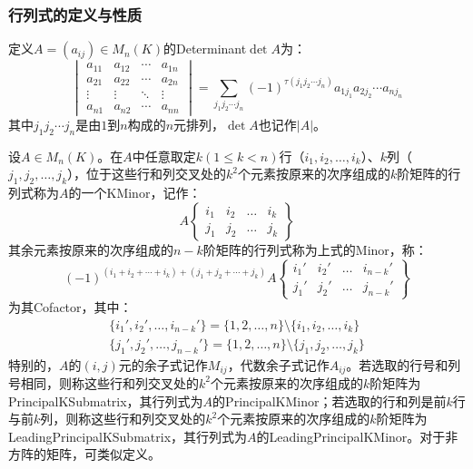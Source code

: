 \subsubsection{行列式的定义与性质}
\begin{definition}
	定义$A=(a_{ij})\in M_{n}(K)$的\gls{Determinant}$\det A$为：
	\begin{equation*}
		\begin{vmatrix}
			a_{11} & a_{12} & \cdots & a_{1n} \\
			a_{21} & a_{22} & \cdots & a_{2n} \\
			\vdots & \vdots & \ddots & \vdots \\
			a_{n1} & a_{n2} & \cdots & a_{nn}
		\end{vmatrix}=
		\sum_{j_1j_2\cdots j_n}(-1)^{\tau(j_1j_2\cdots j_n)}a_{1j_1}a_{2j_2}\cdots a_{nj_n}
	\end{equation*}
	其中$j_1j_2\cdots j_n$是由$1$到$n$构成的$n$元排列，$\det A$也记作$|A|$。
\end{definition} 
\begin{definition}
	设$A\in M_{n}(K)$。在$A$中任意取定$k(1\leqslant k<n)$行（$i_1,i_2,\dots,i_k$）、$k$列（$j_1,j_2,\dots,j_k$），位于这些行和列交叉处的$k^2$个元素按原来的次序组成的$k$阶矩阵的行列式称为$A$的一个\gls{KMinor}，记作：
	\begin{equation*}
		A\left\{
		\begin{array}{*{4}{c}}
			i_1 & i_2 & \dots & i_k \\
			j_1 & j_2 & \dots & j_k
		\end{array}\right\}
	\end{equation*}
	其余元素按原来的次序组成的$n-k$阶矩阵的行列式称为上式的\gls{Minor}，称：
	\begin{equation*}
		(-1)^{(i_1+i_2+\cdots+i_k)+(j_1+j_2+\cdots+j_k)}A\left\{
		\begin{array}{*{4}{c}}
			i_1' & i_2' & \dots & i_{n-k}' \\
			j_1' & j_2' & \dots & j_{n-k}'
		\end{array}\right\}
	\end{equation*}
	为其\gls{Cofactor}，其中：
	\begin{gather*}
		\{i_1',i_2',\dots,i_{n-k}'\}=\{1,2,\dots,n\}\setminus\{i_1,i_2,\dots,i_k\} \\
		\{j_1',j_2',\dots,j_{n-k}'\}=\{1,2,\dots,n\}\setminus\{j_1,j_2,\dots,j_k\}
	\end{gather*}
	特别的，$A$的$(i,j)$元的余子式记作$M_{ij}$，代数余子式记作$A_{ij}$。若选取的行号和列号相同，则称这些行和列交叉处的$k^2$个元素按原来的次序组成的$k$阶矩阵为\gls{PrincipalKSubmatrix}，其行列式为$A$的\gls{PrincipalKMinor}；若选取的行和列是前$k$行与前$k$列，则称这些行和列交叉处的$k^2$个元素按原来的次序组成的$k$阶矩阵为\gls{LeadingPrincipalKSubmatrix}，其行列式为$A$的\gls{LeadingPrincipalKMinor}。对于非方阵的矩阵，可类似定义。
\end{definition}
